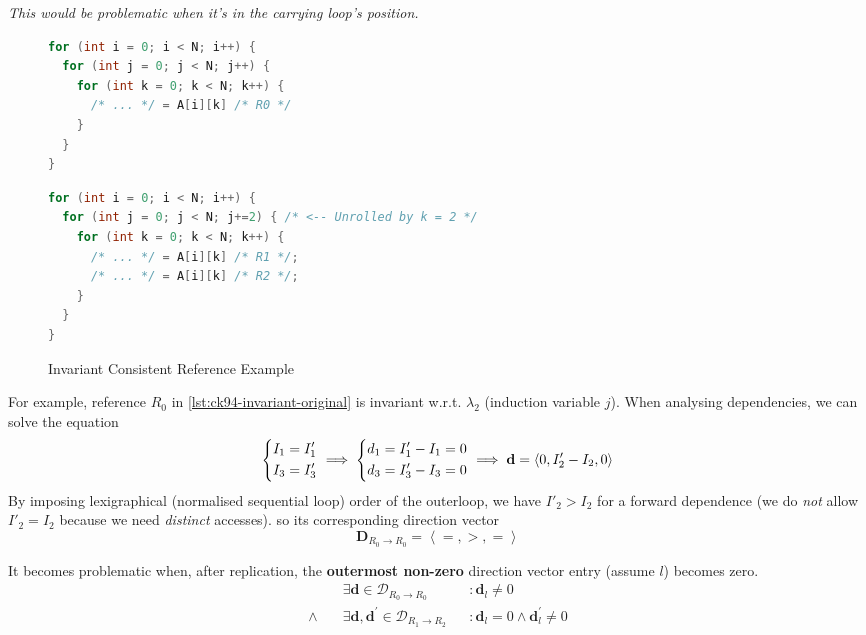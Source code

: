\textit{This would be problematic when it's in the carrying loop's position.}
\begin{figure}[H]
  \centering
  \begin{minipage}[t]{0.48\textwidth}
\begin{lstlisting}[language=C,
  caption={Original},
  label={lst:ck94-invariant-original}]
for (int i = 0; i < N; i++) {
  for (int j = 0; j < N; j++) {
    for (int k = 0; k < N; k++) {
      /* ... */ = A[i][k] /* R0 */
    }
  }
}
\end{lstlisting}
  \end{minipage}%
  \hfill
  \begin{minipage}[t]{0.48\textwidth}
\begin{lstlisting}[language=C,
  caption={Unrolled},
  label={lst:ck94-invariant-unrolled}]
for (int i = 0; i < N; i++) {
  for (int j = 0; j < N; j+=2) { /* <-- Unrolled by k = 2 */
    for (int k = 0; k < N; k++) {
      /* ... */ = A[i][k] /* R1 */;
      /* ... */ = A[i][k] /* R2 */;
    }
  }
}
\end{lstlisting}
  \end{minipage}
  \caption{Invariant Consistent Reference Example}
  \label{fig:ck94-invariant-unroll}
\end{figure}

For example, reference $R_{0}$ in \cref{lst:ck94-invariant-original} is invariant
w.r.t. $\lambda_2$ (induction variable $j$). When analysing dependencies,
we can solve the equation
\[
  \begin{dcases}
    I_1 = I'_1 \\
    I_3 = I'_3
  \end{dcases}
  \implies
  \begin{dcases}
    d_1 = I'_1 - I_1 = 0 \\
    d_3 = I'_3 - I_3 = 0
  \end{dcases}
  \implies
  \mathbf{d} = \left\langle 0, I'_2 - I_2, 0
  \right\rangle
\]
By imposing lexigraphical (normalised sequential loop) order of the outerloop,
we have $I'_2 > I_2$ for a forward dependence (we do \textit{not}
allow $I'_2 = I_2$ because we need \textit{distinct} accesses).
so its corresponding direction vector
\[
  \mathbf{D}_{R_{0}\rightarrow R_{0}} = \left\langle =, >, = \right\rangle
\]

It becomes problematic when, after replication, the \textbf{outermost non-zero} direction vector entry
(assume $l$) becomes zero.\[
  \begin{aligned}
  &\exists \mathbf{d}\in \mathcal{D}_{R_{0}\rightarrow R_{0}}&&: \mathbf{d}_{l}
  \neq 0 \\
  \land \quad
  &\exists \mathbf{d}, \mathbf{d}^{\prime} \in \mathcal{D}_{R_{1}\rightarrow
  R_{2}}&&:
  \mathbf{d}_{l} = 0 \land \mathbf{d}^{\prime}_{l} \neq 0
  \end{aligned}
\]

